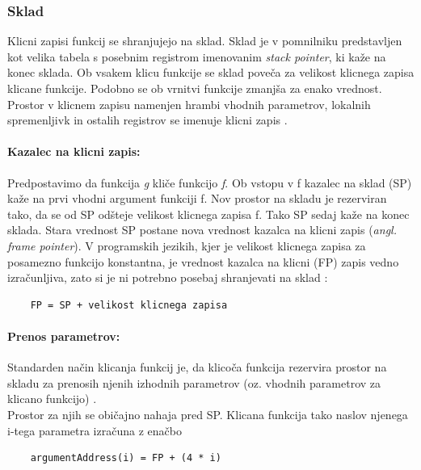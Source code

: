 \documentclass[a4paper, 12p]{book}
\begin{document}
\subsubsection{Sklad}

Klicni zapisi funkcij se shranjujejo na sklad. Sklad je v pomnilniku predstavljen kot velika tabela s posebnim registrom imenovanim \textit{stack pointer}, ki kaže na konec sklada. Ob vsakem klicu funkcije se sklad poveča za velikost klicnega zapisa klicane funkcije. Podobno se ob vrnitvi funkcije zmanjša za enako vrednost. Prostor v klicnem zapisu namenjen hrambi vhodnih parametrov, lokalnih spremenljivk in ostalih registrov se imenuje klicni zapis \cite{modernCompiler}. 

\paragraph{Kazalec na klicni zapis:}

Predpostavimo da funkcija \textit{g} kliče funkcijo \textit{f}. Ob vstopu v f kazalec na sklad (SP) kaže na prvi vhodni argument funkciji f. Nov prostor na skladu je rezerviran tako, da se od SP odšteje velikost klicnega zapisa f. Tako SP sedaj kaže na konec sklada. Stara vrednost SP postane nova vrednost kazalca na klicni zapis (\textit{angl. frame pointer}). V programskih jezikih, kjer je velikost klicnega zapisa za posamezno funkcijo konstantna, je vrednost kazalca na klicni (FP) zapis vedno izračunljiva, zato si je ni potrebno posebaj shranjevati na sklad \cite{modernCompiler}: 

\begin{lstlisting}
	FP = SP + velikost klicnega zapisa
\end{lstlisting}

\paragraph{Prenos parametrov:}

Standarden način klicanja funkcij je, da klicoča funkcija rezervira prostor na skladu za prenosih njenih izhodnih parametrov (oz. vhodnih parametrov za klicano funkcijo) \cite{modernCompiler}. \\ 
\indent Prostor za njih se običajno nahaja pred SP. Klicana funkcija tako naslov njenega i-tega parametra izračuna z enačbo \\
\begin{lstlisting}
	argumentAddress(i) = FP + (4 * i)
\end{lstlisting}
\end{document}

